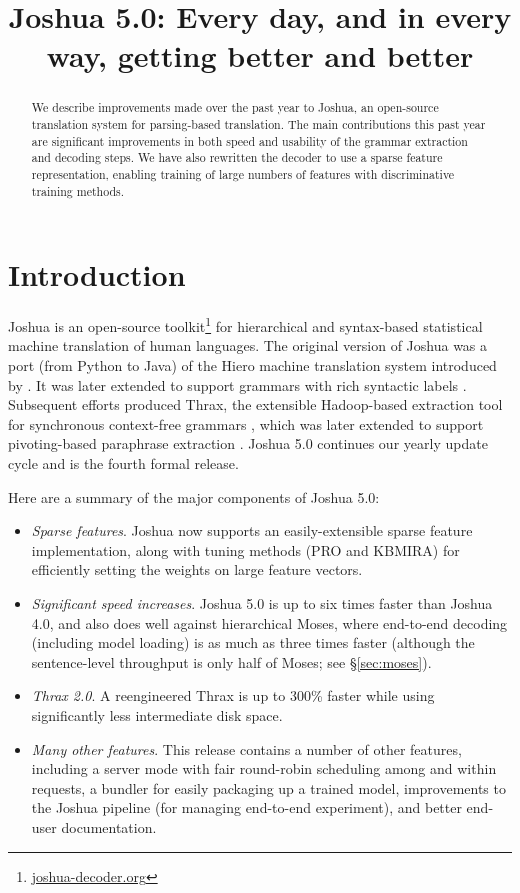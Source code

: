\documentclass[11pt]{article}
\title{Joshua 5.0: Every day, and in every way, getting better and better}
\date{}
\begin{document}
\maketitle

\begin{abstract}
  We describe improvements made over the past year to Joshua, an
  open-source translation system for parsing-based translation. The
  main contributions this past year are significant improvements in
  both speed and usability of the grammar extraction and decoding
  steps. We have also rewritten the decoder to use a sparse feature
  representation, enabling training of large numbers of features with
  discriminative training methods.
\end{abstract}

\section{Introduction}
\label{sec-intro}

Joshua is an open-source toolkit\footnote{\url{joshua-decoder.org}}
for hierarchical and syntax-based statistical machine translation of
human languages.  The original version of Joshua \cite{Joshua-WMT} was
a port (from Python to Java) of the Hiero machine translation system
introduced by .  It was later extended to support
grammars with rich syntactic labels \cite{li2010joshua}. Subsequent
efforts produced Thrax, the extensible Hadoop-based extraction tool
for synchronous context-free grammars \cite{Joshua-3.0}, which was
later extended to support pivoting-based paraphrase extraction
\cite{Joshua-4.0}. Joshua 5.0 continues our yearly update cycle and is
the fourth formal release.

Here are a summary of the major components of Joshua 5.0:

\begin{itemize}
  \item \emph{Sparse features}. Joshua now supports an
    easily-extensible sparse feature implementation, along with tuning
    methods (PRO and KBMIRA) for efficiently setting the weights on
    large feature vectors.
  \item \emph{Significant speed increases}. Joshua 5.0 is up to six
    times faster than Joshua 4.0, and also does well against
    hierarchical Moses, where end-to-end decoding (including model
    loading) is as much as three times faster (although the
    sentence-level throughput is only half of Moses; see
    \S\ref{sec:moses}).
  \item \emph{Thrax 2.0}. A reengineered Thrax is up to 300\% faster
    while using significantly less intermediate disk space.
  \item \emph{Many other features}. This release contains a number of
    other features, including a server mode with fair round-robin
    scheduling among and within requests, a bundler for easily
    packaging up a trained model, improvements to the Joshua pipeline
    (for managing end-to-end experiment), and better end-user
    documentation.
\end{itemize}
\end{document}
